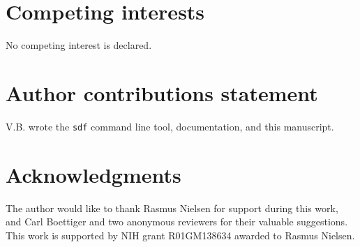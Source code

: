 \documentclass[unnumsec,webpdf,contemporary,large]{oup-authoring-template}%
\theoremstyle{thmstyleone}%
\theoremstyle{thmstyletwo}%
\theoremstyle{thmstylethree}%
\begin{document}
\section{Competing interests}
No competing interest is declared.

\section{Author contributions statement}
V.B. wrote the \texttt{sdf} command line tool, documentation, and this manuscript.

\section{Acknowledgments}

The author would like to thank Rasmus Nielsen for support during this work, and Carl Boettiger and two anonymous reviewers for their valuable suggestions. This work is supported by NIH grant R01GM138634 awarded to Rasmus Nielsen.



\end{document}
